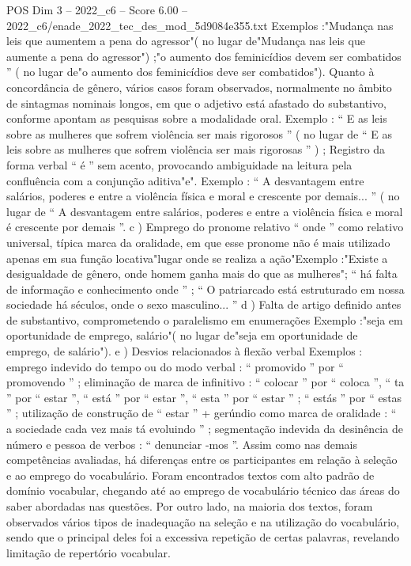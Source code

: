 \begin{textsample}{POS Dim 3 – 2022\_c6 – Score 6.00 – 2022\_c6/enade\_2022\_tec\_des\_mod\_5d9084e355.txt}
Exemplos :"Mudança nas leis que aumentem a pena do agressor"( no lugar de"Mudança nas leis que aumente a pena do agressor") ;"o aumento dos feminicídios devem ser combatidos ” ( no lugar de"o aumento dos feminicídios deve ser combatidos").
Quanto à concordância de gênero, vários casos foram observados, normalmente no âmbito de sintagmas nominais longos, em que o adjetivo está afastado do substantivo, conforme apontam as pesquisas sobre a modalidade oral.
Exemplo : “ E as leis sobre as mulheres que sofrem violência ser mais rigorosos ” ( no lugar de “ E as leis sobre as mulheres que sofrem violência ser mais rigorosas ” ) ; Registro da forma verbal “ é ” sem acento, provocando ambiguidade na leitura pela confluência com a conjunção aditiva"e".
Exemplo : “ A desvantagem entre salários, poderes e entre a violência física e moral e crescente por demais... ” ( no lugar de “ A desvantagem entre salários, poderes e entre a violência física e moral é crescente por demais ”. c ) Emprego do pronome relativo “ onde ” como relativo universal, típica marca da oralidade, em que esse pronome não é mais utilizado apenas em sua função locativa"lugar onde se realiza a ação"Exemplo :"Existe a desigualdade de gênero, onde homem ganha mais do que as mulheres"; “ há falta de informação e conhecimento onde ” ; “ O patriarcado está estruturado em nossa sociedade há séculos, onde o sexo masculino... ” d ) Falta de artigo definido antes de substantivo, comprometendo o paralelismo em enumerações Exemplo :"seja em oportunidade de emprego, salário"( no lugar de"seja em oportunidade de emprego, de salário"). e ) Desvios relacionados à flexão verbal Exemplos : emprego indevido do tempo ou do modo verbal : “ promovido ” por “ promovendo ” ; eliminação de marca de infinitivo : “ colocar ” por “ coloca ”, “ ta ” por “ estar ”, “ está ” por “ estar ”, “ esta ” por “ estar ” ; “ estás ” por “ estas ” ; utilização de construção de “ estar ” + gerúndio como marca de oralidade : “ a sociedade cada vez mais tá evoluindo ” ; segmentação indevida da desinência de número e pessoa de verbos : “ denunciar -mos ”.
Assim como nas demais competências avaliadas, há diferenças entre os participantes em relação à seleção e ao emprego do vocabulário.
Foram encontrados textos com alto padrão de domínio vocabular, chegando até ao emprego de vocabulário técnico das áreas do saber abordadas nas questões.
Por outro lado, na maioria dos textos, foram observados vários tipos de inadequação na seleção e na utilização do vocabulário, sendo que o principal deles foi a excessiva repetição de certas palavras, revelando limitação de repertório vocabular.

\end{textsample}
